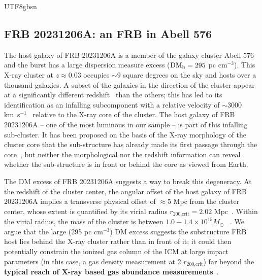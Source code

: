 \documentclass[twocolumn,linenumbers]{aastex631}
\newcommand{\msbold}[1]{\textbf{#1}}
\newcommand{\dmh}{\ensuremath{{\rm DM}_\textrm{h}}}
\begin{document}
\begin{CJK*}{UTF8}{gbsn}
\subsection{FRB 20231206A: an FRB in Abell 576}\label{sec:FRB20231206A}
The host galaxy of FRB 20231206A is a member of the galaxy cluster Abell 576~\citep{abell1989catalog,rines2000infall} and the burst has a large dispersion measure excess ($\dmh=295$ pc cm$^{-3}$). This X-ray cluster at $z \approx 0.03$ occupies $\sim 9$ square degrees on the sky and hosts over a thousand galaxies. A subset of the galaxies in the direction of the cluster appear at a significantly different redshift~\citep{rines2000infall} than the others; this has led to its identification as an infalling subcomponent with a relative velocity of $\sim 3000$ km~s$^{-1}$~\citep{dupke2007merger} relative to the X-ray core of the cluster. The host galaxy of FRB 20231206A -- one of the most luminous in our sample -- is part of this infalling sub-cluster. It has been proposed on the basis of the X-ray morphology of the cluster core that the sub-structure has already made its first passage through the core~\citep{kempner2004chandra}, but neither the morphological nor the redshift information can reveal whether the sub-structure is in front or behind the core as viewed from Earth.

The DM excess of FRB 20231206A suggests a way to break this degeneracy. At the redshift of the cluster center, the angular offset of the host galaxy of FRB 20231206A implies a transverse physical offset of $\approx 5$ Mpc from the cluster center, whose extent is quantified by its virial radius $r_\textrm{200,crit} = 2.02$ Mpc~\citep[see \S3.1 of][]{rines2000infall}. Within the virial radius, the mass of the cluster is between $1.0-1.4 \times 10^{15} M_\odot$ ~\citep{girardi1998optical,rines2000infall}. We argue that the large (295 pc cm$^{-3}$) DM excess suggests the substructure FRB host lies behind the X-ray cluster rather than in front of it; it could then potentially constrain the ionized gas column of the ICM at large impact parameters (in this case, a gas density measurement at 2 $r_\textrm{200,crit}$) far beyond the \msbold{typical reach of X-ray based gas abundance measurements}~\citep[e.g.,][]{ettori1999rosat, mantz2022cosmological}.


\end{CJK*}
\end{document}
